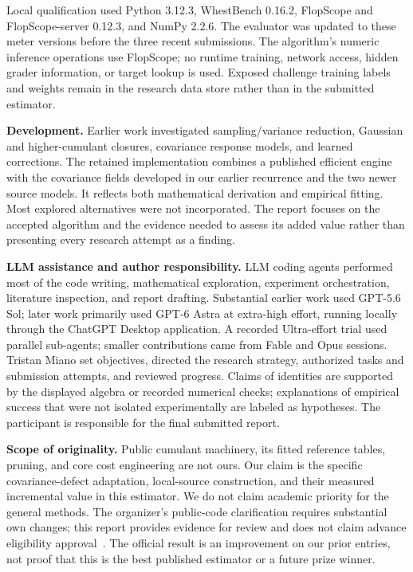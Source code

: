 \documentclass[10pt]{article}
\begin{document}
Local qualification used Python 3.12.3, WhestBench 0.16.2, FlopScope and
FlopScope-server 0.12.3, and NumPy 2.2.6. The evaluator was updated to these
meter versions before the three recent submissions. The algorithm's numeric
inference operations use FlopScope; no runtime training, network access,
hidden grader information, or target lookup is used. Exposed challenge training
labels and weights remain in the research data store rather than in the
submitted estimator.

\textbf{Development.} Earlier work investigated sampling/variance reduction,
Gaussian and higher-cumulant closures, covariance response models, and learned
corrections. The retained implementation combines a published efficient
engine with the covariance fields developed in our earlier recurrence and
the two newer source models. It reflects both mathematical derivation and
empirical fitting. Most explored alternatives were not incorporated. The
report focuses on the accepted algorithm and the evidence needed to assess
its added value rather than presenting every research attempt as a finding.

\textbf{LLM assistance and author responsibility.} LLM coding agents performed
most of the code writing, mathematical exploration, experiment orchestration,
literature inspection, and report drafting. Substantial earlier work used
GPT-5.6 Sol; later work primarily used GPT-6 Astra at extra-high effort,
running locally through the ChatGPT Desktop application. A recorded
Ultra-effort trial used parallel sub-agents; smaller contributions came from
Fable and Opus sessions. Tristan Miano set objectives, directed the research
strategy, authorized tasks and submission attempts, and reviewed progress.
Claims of identities are supported by
the displayed algebra or recorded numerical checks; explanations of empirical
success that were not isolated experimentally are labeled as hypotheses.
The participant is responsible for the final submitted report.

\textbf{Scope of originality.} Public cumulant machinery, its fitted reference
tables, pruning, and core cost engineering are not ours. Our claim is the
specific covariance-defect adaptation, local-source construction, and their
measured incremental value in this estimator. We do not claim academic
priority for the general methods. The organizer's public-code clarification
requires substantial own changes; this report provides evidence for review
and does not claim advance eligibility approval~\cite{reuse}. The official
result is an improvement on our prior entries, not proof that this is the
best published estimator or a future prize winner.
\end{document}
